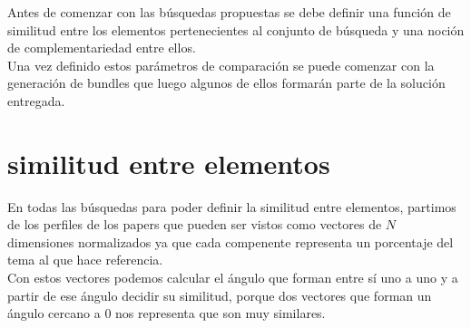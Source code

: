 Antes de comenzar con las búsquedas propuestas se debe definir una función de similitud entre los 
elementos pertenecientes al conjunto de búsqueda y una noción de complementariedad entre ellos.\\
Una vez definido estos parámetros de comparación se puede comenzar con la generación de bundles que 
luego algunos de ellos formarán parte de la solución entregada.
%
\section{similitud entre elementos}
En todas las búsquedas para poder definir la similitud entre elementos, partimos de los perfiles de los papers que pueden ser vistos como vectores de $N$ dimensiones normalizados ya que cada compenente representa un porcentaje del tema al que hace referencia.\\
Con estos vectores podemos calcular el ángulo que forman entre sí uno a uno y a partir de ese ángulo decidir su similitud, porque dos vectores que forman un ángulo cercano a $0$ nos representa que son muy similares.\\
